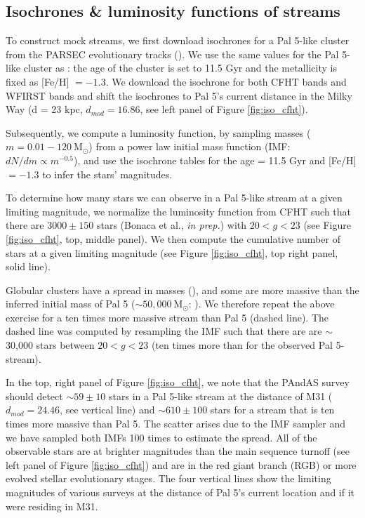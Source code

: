 \documentclass[twocolumn]{aastex62}
\newcommand{\msun}{\textrm{M}_\odot}
\begin{document}
\subsection{Isochrones \& luminosity functions of streams}
\label{sec:lum}
To construct mock streams, we first download isochrones for a Pal 5-like cluster from the PARSEC evolutionary tracks (\citealt{bressan12}). We use the same values for the Pal 5-like cluster as \citet{ibata17}: the age of the cluster is set to 11.5 Gyr and the metallicity is fixed as [Fe/H] $= -1.3$. We download the isochrone for both CFHT bands and WFIRST bands and shift the isochrones to Pal 5's current distance in the Milky Way (d = 23 kpc, $d_{mod} = 16.86$, see left panel of Figure \ref{fig:iso_cfht}). 

Subsequently, we compute a luminosity function, by sampling masses ($m = 0.01 - 120 ~\msun$) from a power law initial mass function (IMF: $dN/dm \propto m^{-0.5}$), and use the isochrone tables for the age = 11.5 Gyr and [Fe/H] $= -1.3$ to infer the stars' magnitudes. 

To determine how many stars we can observe in a Pal 5-like stream at a given limiting magnitude, we normalize the luminosity function from CFHT such that there are  $3000 \pm 150$ stars (Bonaca et al., {\it in prep.}) with $20 < g < 23$ (see Figure \ref{fig:iso_cfht}, top, middle panel). We then compute the cumulative number of stars at a given limiting magnitude (see Figure \ref{fig:iso_cfht}, top right panel, solid line).

Globular clusters have a spread in masses (\citealt{harris96}), and some are more massive than the inferred initial mass of Pal 5 ($\sim 50,000 ~\msun$: \citealt{ibata17}). We therefore repeat the above exercise for a ten times more massive stream than Pal 5 (dashed line). The dashed line was computed by resampling the IMF such that there are are $\sim$ 30,000 stars between $20 < g < 23$ (ten times more than for the observed Pal 5-stream). 

In the top, right panel of Figure \ref{fig:iso_cfht}, we note that the PAndAS survey should detect $\sim 59 \pm 10$ stars in a Pal 5-like stream at the distance of M31 ($d_{mod} = 24.46$, see vertical line) and $\sim 610 \pm 100$ stars for a stream that is ten times more massive than Pal 5. The scatter arises due to the IMF sampler and we have sampled both IMFs 100 times to estimate the spread. All of the observable stars are at brighter magnitudes than the main sequence turnoff (see left panel of Figure \ref{fig:iso_cfht}) and are in the red giant branch (RGB) or more evolved stellar evolutionary stages. The four vertical lines show the limiting magnitudes of various surveys at the distance of Pal 5's current location and if it were residing in M31.
\end{document}
